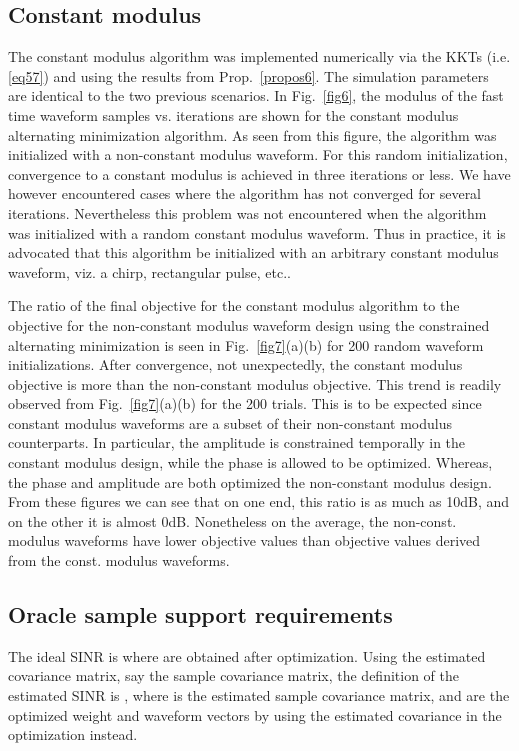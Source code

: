 \documentclass[11pt,draftclsnofoot,onecolumn]{IEEEtran}
\theoremstyle{definition}
\theoremstyle{remark}
\begin{document}
\subsection{Constant modulus}
The constant modulus algorithm was implemented numerically via the KKTs (i.e. \eqref{eq57}) and using the results from Prop.~\ref{propos6}. The simulation parameters are identical to the two previous scenarios. In Fig.~\ref{fig6}, the modulus of the fast time waveform samples vs. iterations are shown for the constant modulus alternating minimization algorithm. As seen from this figure, the algorithm was initialized with a non-constant modulus waveform. For this random initialization, convergence to a constant modulus is achieved in three iterations or less. We have however encountered cases where the algorithm has not converged for several iterations. Nevertheless this problem was not encountered when the algorithm was initialized with  a random constant modulus waveform. Thus in practice, it is advocated that this algorithm be initialized with  an arbitrary constant modulus waveform, viz. a chirp, rectangular pulse, etc..

The ratio of the final objective for the constant modulus algorithm to the objective for the non-constant modulus waveform design using the constrained alternating minimization is seen in Fig.~\ref{fig7}(a)(b) for 200 random waveform initializations. After convergence, not unexpectedly, the constant modulus objective is more than the non-constant modulus objective. This trend is readily observed from Fig.~\ref{fig7}(a)(b) for the 200 trials. This is to be expected since constant modulus waveforms are a subset of their non-constant modulus counterparts. In particular, the amplitude is constrained temporally in the constant modulus design, while the phase is allowed to be optimized. Whereas, the phase and amplitude are both optimized the non-constant modulus design. From these figures we can see that on one end, this ratio is as much as 10dB, and on the other it is almost 0dB. Nonetheless on the average, the non-const. modulus waveforms have lower objective values than objective values derived from the const. modulus waveforms. 
\subsection{Oracle sample support requirements}
The ideal SINR is  where  are obtained after optimization. Using the estimated covariance matrix, say the sample covariance matrix, the definition of the estimated SINR is , where  is the estimated sample covariance matrix, and  are the optimized weight and waveform vectors by using the estimated covariance in the optimization instead.
\end{document}
